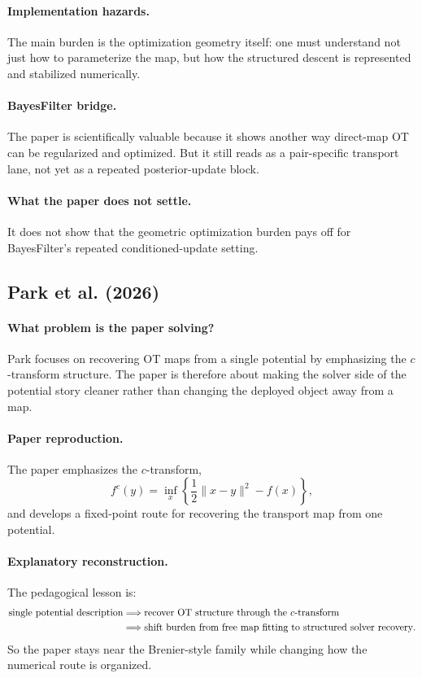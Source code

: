 \documentclass[11pt]{report}
\begin{document}
\paragraph{Implementation hazards.}
The main burden is the optimization geometry itself: one must understand not just
how to parameterize the map, but how the structured descent is represented and
stabilized numerically.

\paragraph{BayesFilter bridge.}
The paper is scientifically valuable because it shows another way direct-map OT can
be regularized and optimized.  But it still reads as a pair-specific transport lane,
not yet as a repeated posterior-update block.

\paragraph{What the paper does not settle.}
It does not show that the geometric optimization burden pays off for BayesFilter's
repeated conditioned-update setting.

\subsection*{Park et al. (2026)}

\paragraph{What problem is the paper solving?}
Park focuses on recovering OT maps from a single potential by emphasizing the
$c$-transform structure.  The paper is therefore about making the solver side of the
potential story cleaner rather than changing the deployed object away from a map.

\paragraph{Paper reproduction.}
The paper emphasizes the $c$-transform,
\begin{equation}
f^c(y)=\inf_x\left\{\frac12\|x-y\|^2-f(x)\right\},
\label{eq:park-c-transform}
\end{equation}
and develops a fixed-point route for recovering the transport map from one
potential.

\paragraph{Explanatory reconstruction.}
The pedagogical lesson is:
\begin{align}
\text{single potential description}
&\Longrightarrow
\text{recover OT structure through the }c\text{-transform}
\notag\\
&\Longrightarrow
\text{shift burden from free map fitting to structured solver recovery}.
\label{eq:park-logic}
\end{align}
So the paper stays near the Brenier-style family while changing how the numerical
route is organized.
\end{document}
